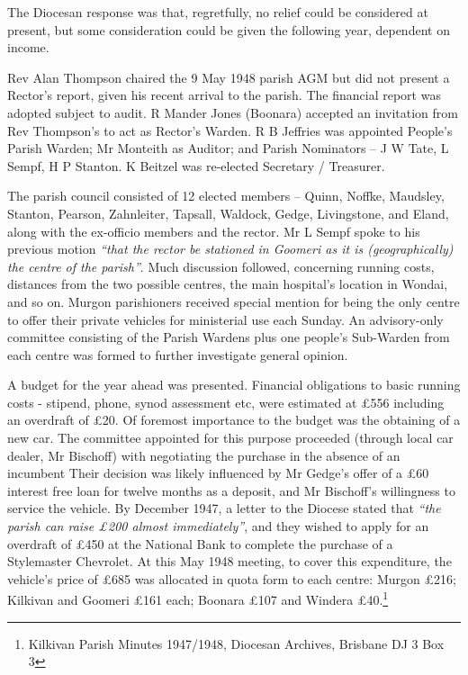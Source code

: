 The Diocesan response was that, regretfully, no relief could be considered at present, but some consideration could be given the following year, dependent on income.



Rev Alan Thompson chaired the 9 May 1948 parish AGM but did not present a Rector's report, given his recent arrival to the parish. The financial report was adopted subject to audit. R Mander Jones (Boonara) accepted an invitation from Rev Thompson's to act as Rector's Warden. R B Jeffries was appointed People's Parish Warden; Mr Monteith as Auditor; and Parish Nominators -- J W Tate, L Sempf, H P Stanton. K Beitzel was re-elected Secretary / Treasurer.



The parish council consisted of 12 elected members -- Quinn, Noffke, Maudsley, Stanton, Pearson, Zahnleiter, Tapsall, Waldock, Gedge, Livingstone, and Eland, along with the ex-officio members and the rector. Mr L Sempf spoke to his previous motion \emph{``that the rector be stationed in Goomeri as it is (geographically) the centre of the parish''}. Much discussion followed, concerning running costs, distances from the two possible centres, the main hospital's location in Wondai, and so on. Murgon parishioners received special mention for being the only centre to offer their private vehicles for ministerial use each Sunday. An advisory-only committee consisting of the Parish Wardens plus one people's Sub-Warden from each centre was formed to further investigate general opinion.



A budget for the year ahead was presented. Financial obligations to basic running costs - stipend, phone, synod assessment etc, were estimated at \pounds556 including an overdraft of \pounds20. Of foremost importance to the budget was the obtaining of a new car. The committee appointed for this purpose proceeded (through local car dealer, Mr Bischoff) with negotiating the purchase in the absence of an incumbent Their decision was likely influenced by Mr Gedge's offer of a \pounds60 interest free loan for twelve months as a deposit, and Mr Bischoff's willingness to service the vehicle. By December 1947, a letter to the Diocese stated that \emph{``the parish can raise \pounds200 almost immediately''}, and they wished to apply for an overdraft of \pounds450 at the National Bank to complete the purchase of a Stylemaster Chevrolet. At this May 1948 meeting, to cover this expenditure, the vehicle's price of \pounds685 was allocated in quota form to each centre: Murgon \pounds216; Kilkivan and Goomeri \pounds161 each; Boonara \pounds107 and Windera \pounds40.\footnote{Kilkivan Parish Minutes 1947/1948, Diocesan Archives, Brisbane DJ 3 Box 3}


